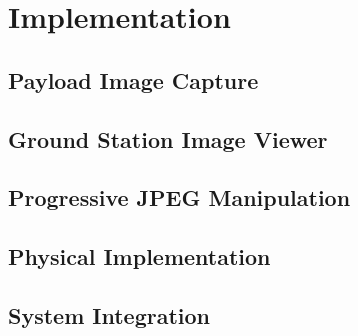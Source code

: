 \chapter{Implementation}


\section{Payload Image Capture}



\section{Ground Station Image Viewer}

\section{Progressive JPEG Manipulation}

\section{Physical Implementation}

\section{System Integration}

